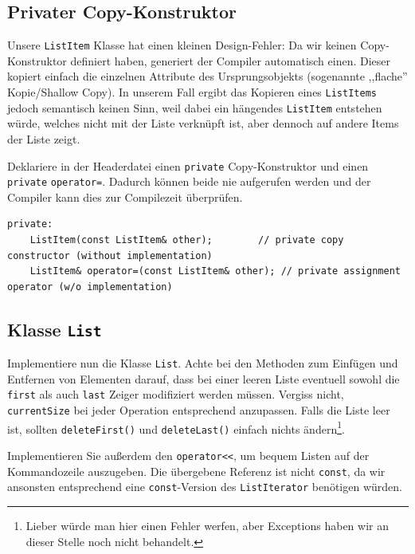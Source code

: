 \subsection{Privater Copy-Konstruktor}
Unsere \texttt{ListItem} Klasse hat einen kleinen Design-Fehler:
Da wir keinen Copy-Konstruktor definiert haben, generiert der Compiler automatisch einen.
Dieser kopiert einfach die einzelnen Attribute des Ursprungsobjekts (sogenannte ,,flache'' Kopie/Shallow Copy).
In unserem Fall ergibt das Kopieren eines \texttt{ListItems} jedoch semantisch keinen Sinn, weil dabei ein hängendes \texttt{ListItem} entstehen würde, welches nicht mit der Liste verknüpft ist, aber dennoch auf andere Items der Liste zeigt.

Deklariere in der Headerdatei einen \texttt{private} Copy-Konstruktor und einen \texttt{private} \texttt{operator=}.
Dadurch können beide nie aufgerufen werden und der Compiler kann dies zur Compilezeit überprüfen.

\begin{lstlisting}
private:
	ListItem(const ListItem& other);		// private copy constructor (without implementation)
	ListItem& operator=(const ListItem& other);	// private assignment operator (w/o implementation)
\end{lstlisting}


\subsection{Klasse \texttt{List}}
Implementiere nun die Klasse \texttt{List}.
Achte bei den Methoden zum Einfügen und Entfernen von Elementen darauf, dass bei einer leeren Liste eventuell sowohl die \texttt{first} als auch \texttt{last} Zeiger modifiziert werden müssen.
Vergiss nicht, \texttt{currentSize} bei jeder Operation entsprechend anzupassen.
Falls die Liste leer ist, sollten \texttt{deleteFirst()} und \texttt{deleteLast()} einfach nichts ändern\footnote{Lieber würde man hier einen Fehler werfen, aber Exceptions haben wir an dieser Stelle noch nicht behandelt.}.

Implementieren Sie außerdem den \texttt{operator<<}, um bequem Listen auf der Kommandozeile auszugeben.
Die übergebene Referenz ist nicht \texttt{const}, da wir ansonsten entsprechend eine \texttt{const}-Version des  \texttt{ListIterator} benötigen würden.


